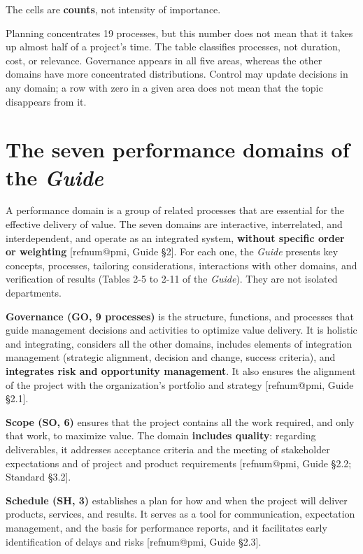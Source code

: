 \documentclass[11pt,a4paper]{article}
\makeatletter
\newcommand{\refnum}[1]{\csname refnum@#1\endcsname}
\makeatother
\begin{document}
The cells are \textbf{counts}, not intensity of importance.

Planning concentrates 19 processes, but this number does not mean that it takes up almost half of a project's time. The table classifies processes, not duration, cost, or relevance. Governance appears in all five areas, whereas the other domains have more concentrated distributions. Control may update decisions in any domain; a row with zero in a given area does not mean that the topic disappears from it.

\section{The seven performance domains of the \textit{Guide}}

A performance domain is a group of related processes that are essential for the effective delivery of value. The seven domains are interactive, interrelated, and interdependent, and operate as an integrated system, \textbf{without specific order or weighting} [\refnum{pmi}, Guide §2]. For each one, the \textit{Guide} presents key concepts, processes, tailoring considerations, interactions with other domains, and verification of results (Tables 2-5 to 2-11 of the \textit{Guide}). They are not isolated departments.

\textbf{Governance (GO, 9 processes)} is the structure, functions, and processes that guide management decisions and activities to optimize value delivery. It is holistic and integrating, considers all the other domains, includes elements of integration management (strategic alignment, decision and change, success criteria), and \textbf{integrates risk and opportunity management}. It also ensures the alignment of the project with the organization's portfolio and strategy [\refnum{pmi}, Guide §2.1].

\textbf{Scope (SO, 6)} ensures that the project contains all the work required, and only that work, to maximize value. The domain \textbf{includes quality}: regarding deliverables, it addresses acceptance criteria and the meeting of stakeholder expectations and of project and product requirements [\refnum{pmi}, Guide §2.2; Standard §3.2].

\textbf{Schedule (SH, 3)} establishes a plan for how and when the project will deliver products, services, and results. It serves as a tool for communication, expectation management, and the basis for performance reports, and it facilitates early identification of delays and risks [\refnum{pmi}, Guide §2.3].
\end{document}
